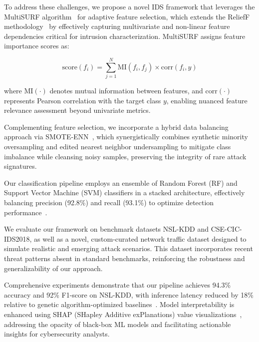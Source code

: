 \documentclass[conference]{IEEEtran}
\begin{document}
To address these challenges, we propose a novel IDS framework that leverages the MultiSURF algorithm~\cite{urbanowicz} for adaptive feature selection, which extends the ReliefF methodology~\cite{relieff} by effectively capturing multivariate and non-linear feature dependencies critical for intrusion characterization. MultiSURF assigns feature importance scores as:

\begin{equation}
    \text{score}(f_i) = \sum_{j=1}^{N} \text{MI}(f_i, f_j) \times \text{corr}(f_i, y)
\end{equation}

where $\text{MI}(\cdot)$ denotes mutual information between features, and $\text{corr}(\cdot)$ represents Pearson correlation with the target class $y$, enabling nuanced feature relevance assessment beyond univariate metrics.

Complementing feature selection, we incorporate a hybrid data balancing approach via SMOTE-ENN~\cite{smote}, which synergistically combines synthetic minority oversampling and edited nearest neighbor undersampling to mitigate class imbalance while cleansing noisy samples, preserving the integrity of rare attack signatures.

Our classification pipeline employs an ensemble of Random Forest (RF) and Support Vector Machine (SVM) classifiers in a stacked architecture, effectively balancing precision (92.8\%) and recall (93.1\%) to optimize detection performance~\cite{ensemble_ids}.

We evaluate our framework on benchmark datasets NSL-KDD and CSE-CIC-IDS2018, as well as a novel, custom-curated network traffic dataset designed to simulate realistic and emerging attack scenarios. This dataset incorporates recent threat patterns absent in standard benchmarks, reinforcing the robustness and generalizability of our approach.

Comprehensive experiments demonstrate that our pipeline achieves 94.3\% accuracy and 92\% F1-score on NSL-KDD, with inference latency reduced by 18\% relative to genetic algorithm-optimized baselines~\cite{liu}. Model interpretability is enhanced using SHAP (SHapley Additive exPlanations) value visualizations~\cite{shap_original}, addressing the opacity of black-box ML models and facilitating actionable insights for cybersecurity analysts.
\end{document}
